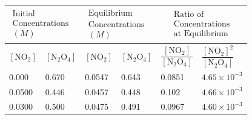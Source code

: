 \documentclass[a4paper,12pt,twocolumn]{article}
\begin{document}
\begin{table}[h!]
    \centering
    \small 
    \begin{tabular}{|p{1.1cm}|p{1.1cm}|p{1.1cm}|p{1.1cm}|p{1cm}|p{2cm}|}
        \hline \multicolumn{2}{|p{2.2cm}|}{$\begin{array}{c}\text {Initial} \\
        \text {Concentrations} \\
        (M)\end{array}$} & \multicolumn{2}{|p{2.2cm}|}{$\begin{array}{c}\text {Equilibrium} \\
        \text {Concentrations} \\
        (M)\end{array}$} & \multicolumn{2}{|c|}{$\begin{array}{c}\text {Ratio of} \\
        \text {Concentrations} \\
        \text {at Equilibrium}\end{array}$} \\
        \hline$\left[\mathrm{NO}_2\right]$ & {$\left[\mathrm{N}_2 \mathrm{O}_4\right]$} & {$\left[\mathrm{NO}_2\right]$} & {$\left[\mathrm{N}_2 \mathrm{O}_4\right]$} & $\dfrac{\left[\mathrm{NO}_2\right]}{\left[\mathrm{N}_2 \mathrm{O}_4\right]}$ & $\dfrac{\left[\mathrm{NO}_2\right]^2}{\left[\mathrm{N}_2 \mathrm{O}_4\right]}$ \\
        \hline 0.000                       & 0.670                                      & 0.0547                         & 0.643                                      & 0.0851                                                                       & $4.65 \times 10^{-3}$                                                          \\
        \hline 0.0500                      & 0.446                                      & 0.0457                         & 0.448                                      & 0.102                                                                        & $4.66 \times 10^{-3}$                                                          \\
        \hline 0.0300                      & 0.500                                      & 0.0475                         & 0.491                                      & 0.0967                                                                       & $4.60 \times 10^{-3}$                                                          \\

\end{tabular}
\end{table}
\end{document}
